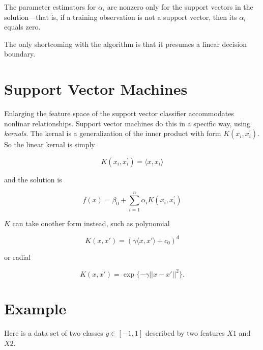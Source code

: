 \documentclass[
]{book}
\newenvironment{Shaded}{\begin{snugshade}}{\end{snugshade}}
\newcommand{\DataTypeTok}[1]{\textcolor[rgb]{0.13,0.29,0.53}{#1}}
\newcommand{\DecValTok}[1]{\textcolor[rgb]{0.00,0.00,0.81}{#1}}
\newcommand{\KeywordTok}[1]{\textcolor[rgb]{0.13,0.29,0.53}{\textbf{#1}}}
\newcommand{\NormalTok}[1]{#1}
\newcommand{\OperatorTok}[1]{\textcolor[rgb]{0.81,0.36,0.00}{\textbf{#1}}}
\newcommand{\StringTok}[1]{\textcolor[rgb]{0.31,0.60,0.02}{#1}}
\begin{document}
The parameter estimators for \(\alpha_i\) are nonzero only for the support vectors in the solution---that is, if a training observation is not a support vector, then its \(\alpha_i\) equals zero.

The only shortcoming with the algorithm is that it presumes a linear decision boundary.

\hypertarget{support-vector-machines-1}{%
\section{Support Vector Machines}\label{support-vector-machines-1}}

Enlarging the feature space of the support vector classifier accommodates nonlinar relationships. Support vector machines do this in a specific way, using \emph{kernals}. The kernal is a generalization of the inner product with form \(K(x_i, x_i^{'})\). So the linear kernal is simply

\[K(x_i, x_i^{'}) = \langle x, x_i \rangle\]

and the solution is

\[f(x) = \beta_0 + \sum_{i = 1}^n {\alpha_i K(x_i, x_i^{'})}\]

\(K\) can take onother form instead, such as polynomial

\[K(x, x') = (\gamma \langle x, x' \rangle + c_0)^d\]

or radial

\[K(x, x') = \exp\{-\gamma ||x - x'||^2\}.\]

\hypertarget{example-18}{%
\section{Example}\label{example-18}}

Here is a data set of two classes \(y \in [-1, 1]\) described by two features \(X1\) and \(X2\).

\begin{Shaded}
\end{Shaded}
\end{document}
